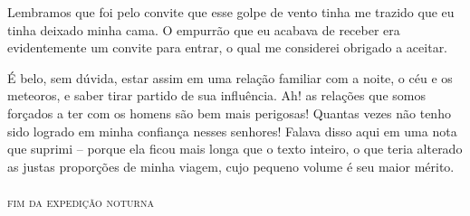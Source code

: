  Lembramos que foi pelo convite que esse golpe de vento tinha me trazido
que eu tinha deixado minha cama. O empurrão que eu acabava de receber
era evidentemente um convite para entrar, o qual me considerei obrigado
a aceitar.

 É belo, sem dúvida, estar assim em uma relação familiar com a noite, o
céu e os meteoros, e saber tirar partido de sua influência. Ah! as
relações que somos forçados a ter com os homens são bem mais perigosas!
Quantas vezes não tenho sido logrado em minha confiança nesses
senhores! Falava disso aqui em uma nota que suprimi -- porque ela
ficou mais longa que o texto inteiro, o que teria alterado as justas
proporções de minha viagem, cujo pequeno volume é seu maior mérito.
\ \\

\hfil\textsc{fim da expedição noturna}




